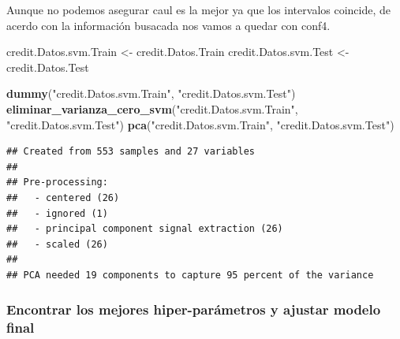 \documentclass[
]{article}
\newenvironment{Shaded}{\begin{snugshade}}{\end{snugshade}}
\newcommand{\FunctionTok}[1]{\textcolor[rgb]{0.13,0.29,0.53}{\textbf{#1}}}
\newcommand{\NormalTok}[1]{#1}
\newcommand{\OtherTok}[1]{\textcolor[rgb]{0.56,0.35,0.01}{#1}}
\newcommand{\StringTok}[1]{\textcolor[rgb]{0.31,0.60,0.02}{#1}}
\begin{document}
Aunque no podemos asegurar caul es la mejor ya que los intervalos
coincide, de acerdo con la información busacada nos vamos a quedar con
conf4.

\begin{Shaded}
\begin{Highlighting}[]
\NormalTok{credit.Datos.svm.Train }\OtherTok{\textless{}{-}}\NormalTok{ credit.Datos.Train}
\NormalTok{credit.Datos.svm.Test }\OtherTok{\textless{}{-}}\NormalTok{ credit.Datos.Test}

\FunctionTok{dummy}\NormalTok{(}\StringTok{"credit.Datos.svm.Train"}\NormalTok{, }\StringTok{"credit.Datos.svm.Test"}\NormalTok{)}
\FunctionTok{eliminar\_varianza\_cero\_svm}\NormalTok{(}\StringTok{"credit.Datos.svm.Train"}\NormalTok{, }\StringTok{"credit.Datos.svm.Test"}\NormalTok{)}
\FunctionTok{pca}\NormalTok{(}\StringTok{"credit.Datos.svm.Train"}\NormalTok{, }\StringTok{"credit.Datos.svm.Test"}\NormalTok{)}
\end{Highlighting}
\end{Shaded}

\begin{verbatim}
## Created from 553 samples and 27 variables
## 
## Pre-processing:
##   - centered (26)
##   - ignored (1)
##   - principal component signal extraction (26)
##   - scaled (26)
## 
## PCA needed 19 components to capture 95 percent of the variance
\end{verbatim}

\hypertarget{encontrar-los-mejores-hiper-paruxe1metros-y-ajustar-modelo-final-1}{%
\subsubsection{Encontrar los mejores hiper-parámetros y ajustar modelo
final}\label{encontrar-los-mejores-hiper-paruxe1metros-y-ajustar-modelo-final-1}}
\end{document}
